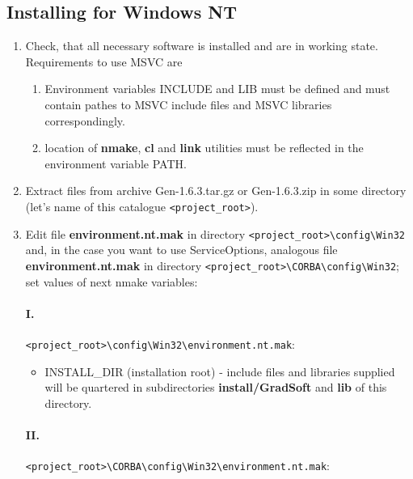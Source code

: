 \documentclass[10pt]{article}
\newcommand{\version}{1.6.3}
\begin{document}
\subsection{ Installing for Windows NT }

\begin{enumerate}
 \item Check, that all necessary software is installed and are in working state.
       Requirements to use MSVC are
       \begin{enumerate}
       \item Environment variables INCLUDE and LIB must be defined and must contain pathes
             to MSVC include files and MSVC libraries correspondingly.
       \item location of {\bf nmake}, {\bf cl} and {\bf link} utilities must be reflected
             in the environment variable PATH.
       \end{enumerate}
 \item Extract files from archive Gen-\version.tar.gz or Gen-\version.zip in some directory
       (let's name of  this catalogue \verb|<project_root>|).

 \item Edit file {\bf environment.nt.mak} in directory \verb|<project_root>\config\Win32|
       and, in the case you want to use ServiceOptions,
       analogous file {\bf environment.nt.mak} in directory
       \verb|<project_root>\CORBA\config\Win32|;
       set values of next nmake variables:

       \paragraph{I.} \verb|<project_root>\config\Win32\environment.nt.mak|:

       \begin{itemize}

       \item INSTALL\_DIR (installation root) - include files and libraries supplied
             will be quartered in subdirectories {\bf install/GradSoft} and {\bf lib}
             of this directory.

       \end{itemize}

       \paragraph{II.} \verb|<project_root>\CORBA\config\Win32\environment.nt.mak|:


\end{enumerate}
\end{document}
